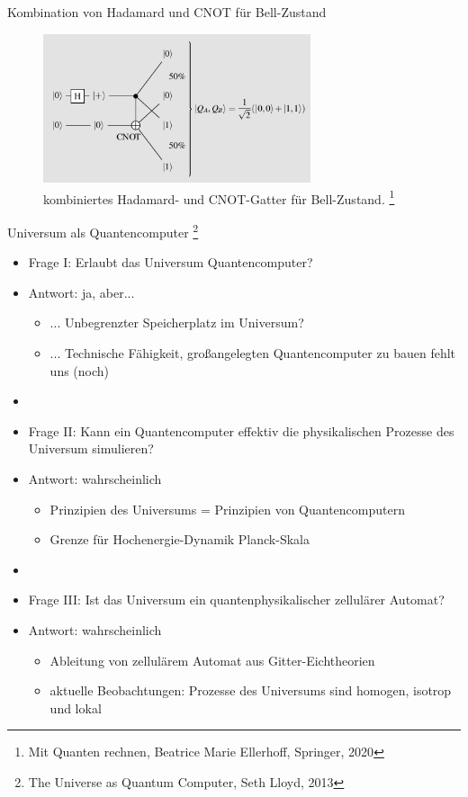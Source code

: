 \documentclass[aspectratio=1610, 9pt]{beamer}
\begin{document}
\begin{frame}{Kombination von Hadamard und CNOT für Bell-Zustand}
  \begin{figure}
      \includegraphics[width=0.7\textwidth]{images/kombi.png}
      \caption{kombiniertes Hadamard- und CNOT-Gatter für Bell-Zustand. \footnote[200]{Mit Quanten rechnen, Beatrice Marie Ellerhoff, Springer, 2020}}
  \end{figure}
\end{frame}

\begin{frame}{Universum als Quantencomputer \footnote[400]{The Universe as Quantum Computer, Seth Lloyd, 2013}}
  \begin{itemize}
    \item Frage I: Erlaubt das Universum Quantencomputer?
    \item Antwort: ja, aber...
    \begin{itemize}
      \item[] ... Unbegrenzter Speicherplatz im Universum?
      \item[] ... Technische Fähigkeit, großangelegten Quantencomputer zu bauen fehlt uns (noch)
    \end{itemize}
    \item[]
    \item Frage II: Kann ein Quantencomputer effektiv die physikalischen Prozesse des Universum simulieren?
    \item Antwort: wahrscheinlich
    \begin{itemize}
      \item[] Prinzipien des Universums = Prinzipien von Quantencomputern
      \item[] Grenze für Hochenergie-Dynamik \rightarrow Planck-Skala
    \end{itemize}
    \item[]
    \item Frage III: Ist das Universum ein quantenphysikalischer zellulärer Automat?
    \item Antwort: wahrscheinlich
    \begin{itemize}
      \item[] Ableitung von zellulärem Automat aus Gitter-Eichtheorien
      \item[] aktuelle Beobachtungen: Prozesse des Universums sind homogen, isotrop und lokal
    \end{itemize}
  \end{itemize}

\end{frame}
\end{document}
